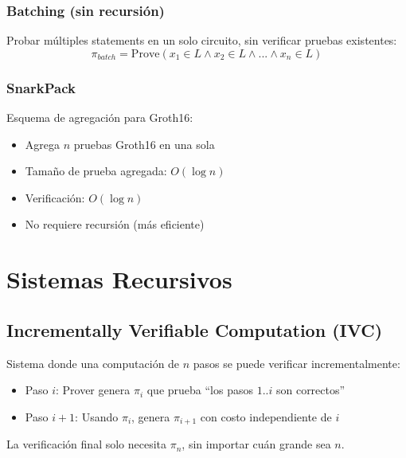 \documentclass[11pt,a4paper,twoside]{book}
\begin{document}
\subsubsection{Batching (sin recursi\'on)}

\begin{definition}
Probar m\'ultiples statements en un solo circuito, sin verificar pruebas existentes:
\[
\pi_{batch} = \text{Prove}(x_1 \in L \land x_2 \in L \land ... \land x_n \in L)
\]
\end{definition}

\subsubsection{SnarkPack}

\begin{definition}[SnarkPack]
Esquema de agregaci\'on para Groth16:
\begin{itemize}
    \item Agrega $n$ pruebas Groth16 en una sola
    \item Tama\~no de prueba agregada: $O(\log n)$
    \item Verificaci\'on: $O(\log n)$
    \item No requiere recursi\'on (m\'as eficiente)
\end{itemize}
\end{definition}

\section{Sistemas Recursivos}
\label{sec:recursive-systems}

\subsection{Incrementally Verifiable Computation (IVC)}

\begin{definition}[IVC]
Sistema donde una computaci\'on de $n$ pasos se puede verificar incrementalmente:
\begin{itemize}
    \item Paso $i$: Prover genera $\pi_i$ que prueba ``los pasos $1..i$ son correctos''
    \item Paso $i+1$: Usando $\pi_i$, genera $\pi_{i+1}$ con costo independiente de $i$
\end{itemize}

La verificaci\'on final solo necesita $\pi_n$, sin importar cu\'an grande sea $n$.
\end{definition}
\end{document}
